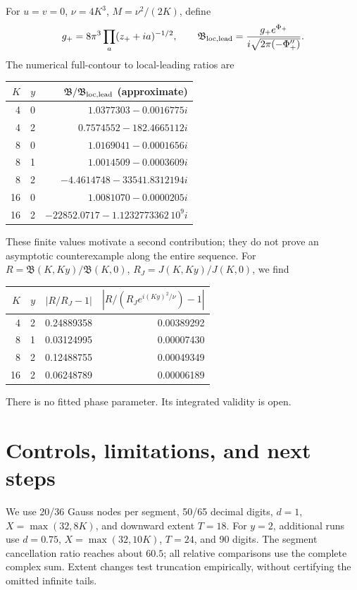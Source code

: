 \documentclass[11pt,a4paper]{article}
\begin{document}
For \(u=v=0\), \(\nu=4K^3\), \(M=\nu^2/(2K)\), define
\[
 g_+=8\pi^3\prod_a(z_++ia)^{-1/2},\qquad
 \mathfrak B_{\rm loc,lead}=\frac{g_+e^{\Phi_+}}
 {i\sqrt{2\pi(-\Phi''_+)}}.
\]
The numerical full-contour to local-leading ratios are
\begin{center}\begin{tabular}{rrr}\toprule
\(K\)&\(y\)&\(\mathfrak B/\mathfrak B_{\rm loc,lead}\) (approximate)\\\midrule
4&0&\(1.0377303-0.0016775i\)\\
4&2&\(0.7574552-182.4665112i\)\\
8&0&\(1.0169041-0.0001656i\)\\
8&1&\(1.0014509-0.0003609i\)\\
8&2&\(-4.4614748-33541.8312194i\)\\
16&0&\(1.0081070-0.0000205i\)\\
16&2&\(-22852.0717-1.1232773362\,10^9i\)\\\bottomrule
\end{tabular}\end{center}
These finite values motivate a second contribution; they do not prove
an asymptotic counterexample along the entire sequence.
For \(R=\mathfrak B(K,Ky)/\mathfrak B(K,0)\),
\(R_J=J(K,Ky)/J(K,0)\), we find
\begin{center}\begin{tabular}{rrrr}\toprule
\(K\)&\(y\)&\(|R/R_J-1|\)&\(|R/(R_Je^{i(Ky)^2/\nu})-1|\)\\\midrule
4&2&0.24889358&0.00389292\\
8&1&0.03124995&0.00007430\\
8&2&0.12488755&0.00049349\\
16&2&0.06248789&0.00006189\\\bottomrule
\end{tabular}\end{center}
There is no fitted phase parameter. Its integrated validity is open.

\newpage
\section{Controls, limitations, and next steps}
We use 20/36 Gauss nodes per segment, 50/65 decimal digits, \(d=1\),
\(X=\max(32,8K)\), and downward extent \(T=18\).
For \(y=2\), additional runs use \(d=0.75\),
\(X=\max(32,10K)\), \(T=24\), and 90 digits.
The segment cancellation ratio reaches about \(60.5\);
all relative comparisons use the complete complex sum.
Extent changes test truncation empirically, without certifying
the omitted infinite tails.
\end{document}
